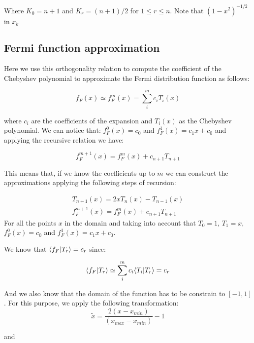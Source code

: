 Where $K_0 = n + 1$ and $K_r = (n + 1)/2$ for $1 \leq r \leq n$. Note that $(1-x^2)^{-1/2}$ in $x_k$


\subsection{Fermi function approximation}

Here we use this orthogonality relation to compute the coefficient of the Chebyshev polynomial to approximate the Fermi distribution function as follows:

\begin{equation}
  f_F(x) \simeq f^m_F(x) = \sum_i^m c_i T_i(x)
\end{equation}

where $c_i$ are the coefficients of the expansion and $T_i(x)$ as the Chebyshev polynomial.
We can notice that: $f^0_F(x) = c_0$ and $f^1_F(x) = c_1x + c_0$ and applying the recursive relation we have: 

\begin{equation}
  f^{m+1}_F(x) = f^m_F(x) + c_{n+1}T_{n+1}
\end{equation}

This means that, if we know the coefficients up to $m$ we can construct the approximations applying the following steps of recursion: 

\begin{equation}
  \begin{array}{ccc}    
    T_{n+1}(x) = 2xT_n(x) - T_{n-1}(x)  \\
    f^{m+1}_F(x) = f^m_F(x) + c_{n+1}T_{n+1}
  \end{array}    
\end{equation}
For all the points $x$ in the domain and taking into account that $T_0 = 1$, $T_1=x$, $f^0_F(x) = c_0$ and $f^1_F(x) = c_1x + c_0$.

We know that $\langle f_F | T_r \rangle = c_r$ since: 

\begin{equation}
  \langle f_F | T_r \rangle \simeq \sum_i^m c_i \langle T_i | T_r \rangle = c_r
\end{equation}

And we also know that the domain of the function has to be constrain to $[-1,1]$. For this purpose, we apply the following transformation:
\begin{equation}
  \tilde{x} = \frac{2(x-x_{min})} {(x_{max}-x_{min})} - 1
\end{equation}

and 


